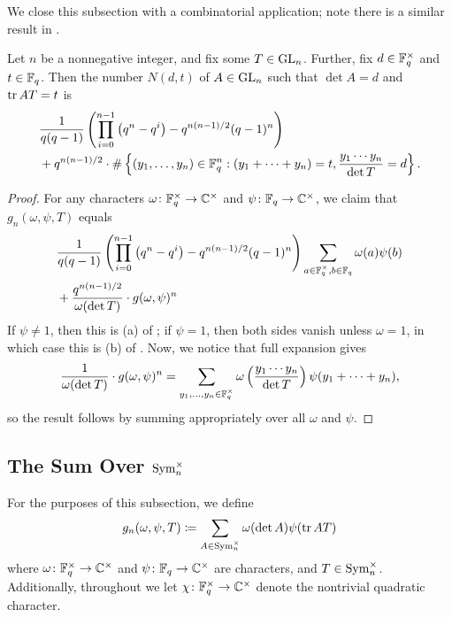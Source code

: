 We close this subsection with a combinatorial application; note there is a similar result in \cite[Theorem~6.2]{kim-gauss-sum}.
\begin{corollary}
    Let $n$ be a nonnegative integer, and fix some $T\in\mathrm{GL}_n$. Further, fix $d\in\mathbb F_q^\times$ and $t\in\mathbb F_q$. Then the number $N(d,t)$ of $A\in\mathrm{GL}_n$ such that $\det A=d$ and $\operatorname{tr} AT=t$ is
    \begin{align*}
        &\frac1{q(q-1)}\left(\prod_{i=0}^{n-1}\left(q^n-q^i\right)-q^{n(n-1)/2}(q-1)^n\right) \\
        &+q^{n(n-1)/2}\cdot\#\left\{(y_1,\ldots,y_n)\in\mathbb F_q^n:(y_1+\cdots+y_n)=t,\frac{y_1\cdots y_n}{\det T}=d\right\}.
    \end{align*}
\end{corollary}
\begin{proof}
    For any characters $\omega\colon\mathbb F_q^\times\to\mathbb C^\times$ and $\psi\colon\mathbb F_q\to\mathbb C^\times$, we claim that $g_n(\omega,\psi,T)$ equals
    \begin{align*}
        &\frac1{q(q-1)}\left(\prod_{i=0}^{n-1}\left(q^n-q^i\right)-q^{n(n-1)/2}(q-1)^n\right)\sum_{a\in\mathbb F_q^\times,b\in\mathbb F_q}\omega(a)\psi(b) \\
        &+ \frac{q^{n(n-1)/2}}{\omega(\det T)}\cdot g(\omega,\psi)^n
    \end{align*}
    If $\psi\ne1$, then this is (a) of ; if $\psi=1$, then both sides vanish unless $\omega=1$, in which case this is (b) of . Now, we notice that full expansion gives
    \[\frac1{\omega(\det T)}\cdot g(\omega,\psi)^n=\sum_{y_1,\ldots,y_n\in\mathbb F_q^\times}\omega\left(\frac{y_1\cdots y_n}{\det T}\right)\psi(y_1+\cdots+y_n),\]
    so the result follows by summing appropriately over all $\omega$ and $\psi$.
\end{proof}

\subsection{The Sum Over \texorpdfstring{$\operatorname{Sym}_n^\times$}{ Sym}}
For the purposes of this subsection, we define
\[g_n(\omega,\psi,T)\coloneqq\sum_{A\in\operatorname{Sym}_n^\times}\omega(\det A)\psi(\operatorname{tr} AT)\]
where $\omega\colon\mathbb F_q^\times\to\mathbb C^\times$ and $\psi\colon\mathbb F_q\to\mathbb C^\times$ are characters, and $T\in\operatorname{Sym}_n^\times$. Additionally, throughout we let $\chi\colon\mathbb F_q^\times\to\mathbb C^\times$ denote the nontrivial quadratic character.

